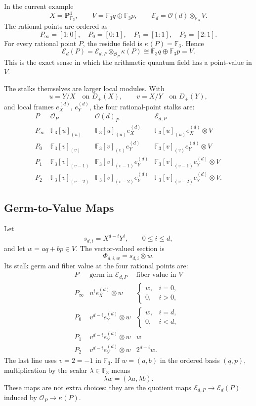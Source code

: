 In the current example
\[
  X=\mathbf P^1_{\mathbb F_3},\qquad
  V=\mathbb F_3q\oplus\mathbb F_3p,\qquad
  \mathcal E_d=\mathcal O(d)\otimes_{\mathbb F_3}V.
\]
The rational points are ordered as
\[
  P_\infty=[1:0],\quad P_0=[0:1],\quad P_1=[1:1],\quad P_2=[2:1].
\]
For every rational point \(P\), the residue field is \(\kappa(P)=\mathbb F_3\).
Hence
\[
  \mathcal E_d(P)
  =
  \mathcal E_{d,P}\otimes_{\mathcal O_P}\kappa(P)
  \cong
  \mathbb F_3q\oplus\mathbb F_3p=V.
\]
This is the exact sense in which the arithmetic quantum field has a
point-value in \(V\).

The stalks themselves are larger local modules.  With
\[
  u=Y/X\quad\text{on }D_+(X),\qquad
  v=X/Y\quad\text{on }D_+(Y),
\]
and local frames \(e_X^{(d)}\), \(e_Y^{(d)}\), the four rational-point stalks
are:
\[
\begin{array}{c|c|c|c}
P & \mathcal O_P & \mathcal O(d)_P & \mathcal E_{d,P}\\
\hline
P_\infty & \mathbb F_3[u]_{(u)}
  & \mathbb F_3[u]_{(u)}e_X^{(d)}
  & \mathbb F_3[u]_{(u)}e_X^{(d)}\otimes V\\
P_0 & \mathbb F_3[v]_{(v)}
  & \mathbb F_3[v]_{(v)}e_Y^{(d)}
  & \mathbb F_3[v]_{(v)}e_Y^{(d)}\otimes V\\
P_1 & \mathbb F_3[v]_{(v-1)}
  & \mathbb F_3[v]_{(v-1)}e_Y^{(d)}
  & \mathbb F_3[v]_{(v-1)}e_Y^{(d)}\otimes V\\
P_2 & \mathbb F_3[v]_{(v-2)}
  & \mathbb F_3[v]_{(v-2)}e_Y^{(d)}
  & \mathbb F_3[v]_{(v-2)}e_Y^{(d)}\otimes V.
\end{array}
\]

\subsection{Germ-to-Value Maps}

Let
\[
  s_{d,i}=X^{d-i}Y^i,\qquad 0\leq i\leq d,
\]
and let \(w=aq+bp\in V\).  The vector-valued section is
\[
  \Phi_{d,i,w}=s_{d,i}\otimes w.
\]
Its stalk germ and fiber value at the four rational points are:
\[
\begin{array}{c|c|c}
P & \text{germ in }\mathcal E_{d,P} & \text{fiber value in }V\\
\hline
P_\infty
  & u^i e_X^{(d)}\otimes w
  & \begin{cases}w,&i=0,\\0,&i>0,\end{cases}\\
P_0
  & v^{d-i} e_Y^{(d)}\otimes w
  & \begin{cases}w,&i=d,\\0,&i<d,\end{cases}\\
P_1
  & v^{d-i} e_Y^{(d)}\otimes w
  & w\\
P_2
  & v^{d-i} e_Y^{(d)}\otimes w
  & 2^{d-i}w.
\end{array}
\]
The last line uses \(v=2=-1\) in \(\mathbb F_3\).  If \(w=(a,b)\) in the
ordered basis \((q,p)\), multiplication by the scalar \(\lambda\in\mathbb F_3\)
means
\[
  \lambda w=(\lambda a,\lambda b).
\]
These maps are not extra choices: they are the quotient maps
\(\mathcal E_{d,P}\to\mathcal E_d(P)\) induced by
\(\mathcal O_P\to\kappa(P)\).

